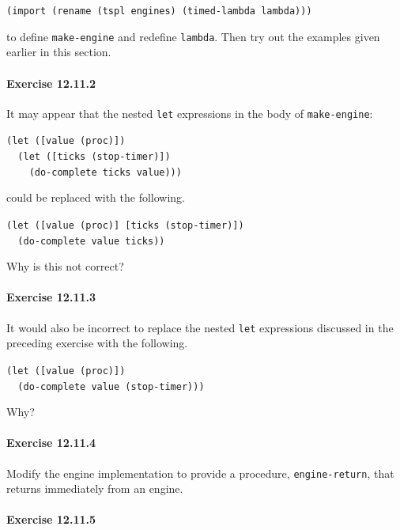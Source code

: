 \texttt{(import (rename (tspl engines) (timed-lambda lambda)))}

to define \texttt{make-engine} and redefine \texttt{lambda}.
Then try out the examples given earlier in this section.


\paragraph{Exercise \label{examples_g213}12.11.2}


\label{examples_s102}It may appear that the nested \texttt{let} expressions in the body of
\texttt{make-engine}:


\begin{alltt}
(let ([value (proc)])
  (let ([ticks (stop-timer)])
    (do-complete ticks value)))
\end{alltt}


could be replaced with the following.


\begin{alltt}
(let ([value (proc)] [ticks (stop-timer)])
  (do-complete value ticks))
\end{alltt}


Why is this not correct?


\paragraph{Exercise \label{examples_g214}12.11.3}


\label{examples_s103}It would also be incorrect to replace the
nested \texttt{let} expressions discussed in the preceding exercise
with the following.


\begin{alltt}
(let ([value (proc)])
  (do-complete value (stop-timer)))
\end{alltt}


Why?


\paragraph{Exercise \label{examples_g215}12.11.4}


\label{examples_s104}Modify the engine implementation to provide a procedure,
\texttt{engine-return}, that returns immediately from an engine.


\paragraph{Exercise \label{examples_g216}12.11.5}


